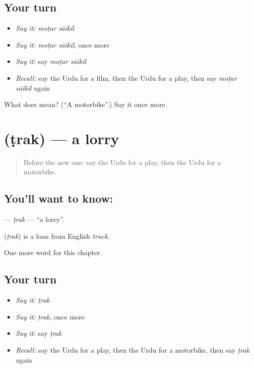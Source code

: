 \subsection*{Your turn}
\begin{itemize}
\raggedright
  \item \emph{Say it:} \emph{moṭar sāikil}
  \item \emph{Say it:} \emph{moṭar sāikil}, once more
  \item \emph{Say it:} say \emph{moṭar sāikil}
  \item \emph{Recall:} say the Urdu for a film, then the Urdu for a play, then say \emph{moṭar sāikil} again
\end{itemize}

\begin{tcolorbox}[breakable,colback=teal!4,colframe=teal!35!black,title={Before you move on}]
What does   mean? (\textquotedblleft{}A motorbike\textquotedblright{}.) Say it once more.
\end{tcolorbox}
\section[\texorpdfstring{\ur{ٹرک} (ṭrak)}{ٹرک (ṭrak)}]{ (ṭrak) — a lorry}

\label{lesson:UR-C229-trak}



\begin{quote}
Before the new one: say the Urdu for a play, then the Urdu for a motorbike.
\end{quote}

\subsection*{You'll want to know: }
\textbf{} — \emph{ṭrak} — \textquotedblleft{}a lorry\textquotedblright{}.

\begin{cousinweb}
\textbf{} (\emph{ṭrak}) is a loan from English \emph{truck}.
\end{cousinweb}

\begin{grammarlens}[title={What you've built}]
One more word for this chapter.
\end{grammarlens}

\subsection*{Your turn}
\begin{itemize}
\raggedright
  \item \emph{Say it:} \emph{ṭrak}
  \item \emph{Say it:} \emph{ṭrak}, once more
  \item \emph{Say it:} say \emph{ṭrak}
  \item \emph{Recall:} say the Urdu for a play, then the Urdu for a motorbike, then say \emph{ṭrak} again
\end{itemize}

